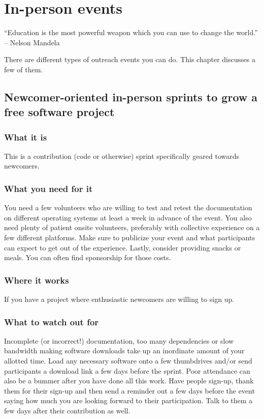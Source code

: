 \chapter{In-person events}

“Education is the most powerful weapon which you can use to change the world.” -- Nelson Mandela

There are different types of outreach events you can do. This chapter discusses a few of them. 

\section{Newcomer-oriented in-person sprints to grow a free software project}
\subsection{What it is}
This is a contribution (code or otherwise) sprint specifically geared towards newcomers.

\subsection{What you need for it}
You need a few volunteers who are willing to test and retest the documentation on different operating systems at least a week in advance of the event. You also need plenty of patient onsite volunteers, preferably with collective experience on a few different platforms. Make sure to publicize your event and what participants can expect to get out of the experience. Lastly, consider providing snacks or meals. You can often find sponsorship for those costs.

\subsection{Where it works}
If you have a project where enthusiastic newcomers are willing to sign up.

\subsection{What to watch out for}
Incomplete (or incorrect!) documentation, too many dependencies or slow bandwidth making software downloads take up an inordinate amount of your allotted time. Load any necessary software onto a few thumbdrives and/or send participants a download link a few days before the sprint. Poor attendance can also be a bummer after you have done all this work. Have people sign-up, thank them for their sign-up and then send a reminder out a few days before the event saying how much you are looking forward to their participation. Talk to them a few days after their contribution as well.

